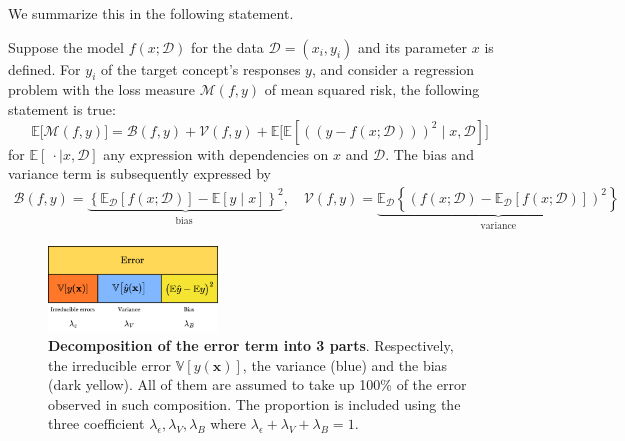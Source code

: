\documentclass[10pt,oneside,oldfontcommands,dvipsnames,article]{memoir}
\begin{document}
We summarize this in the following statement. 

\begin{theorem}
    Suppose the model $f(x;\mathcal{D})$ for the data $\mathcal{D}=(x_i, y_i)$ and its parameter $x$ is defined. For $y_{i}$ of the target concept's responses $y$, and consider a regression problem with the loss measure $\mathcal{M}(f,y)$ of mean squared risk, the following statement is true: \begin{equation}
        \mathbb{E}\big[\mathcal{M}(f,y)\big] = \mathcal{B}(f,y) + \mathcal{V}(f,y) + \mathbb{E}\Big[\mathbb{E} \left[((y-f(x;\mathcal{D})))^{2}\mid x, \mathcal{D}\right]\Big]
    \end{equation}
    for $\mathbb{E}[\:\cdot\mid x, \mathcal{D}]$ any expression with dependencies on $x$ and $\mathcal{D}$. The bias and variance term is subsequently expressed by 
    \begin{align}
        \mathcal{B}(f,y) = \underbrace{\left\{ \mathbb{E}_{\mathcal{D}}[f(x;\mathcal{D})] - \mathbb{E}[y\mid x] \right\}^{2}}_{\text{bias }}, \quad \mathcal{V}(f,y) =\underbrace{\mathbb{E}_{\mathcal{D}} \left\{(f(x;\mathcal{D})- \mathbb{E}_{\mathcal{D}}[f(x;\mathcal{D})])^{2}\right\}}_{\text{variance}}
    \end{align}
\end{theorem}

\begin{figure}[htb]
    \centering
    \includegraphics[width=0.4\textwidth]{img/error_decomposition.png}
    \caption{\textbf{Decomposition of the error term into 3 parts}. Respectively, the irreducible error $\mathbb{V}[y(\mathbf{x})]$, the variance (blue) and the bias (dark yellow). All of them are assumed to take up 100\% of the error observed in such composition. The proportion is included using the three coefficient $\lambda_{\epsilon},\lambda_{V},\lambda_{B}$ where $\lambda_{\epsilon}+\lambda_{V}+\lambda_{B}=1$.}
\end{figure}
\end{document}
